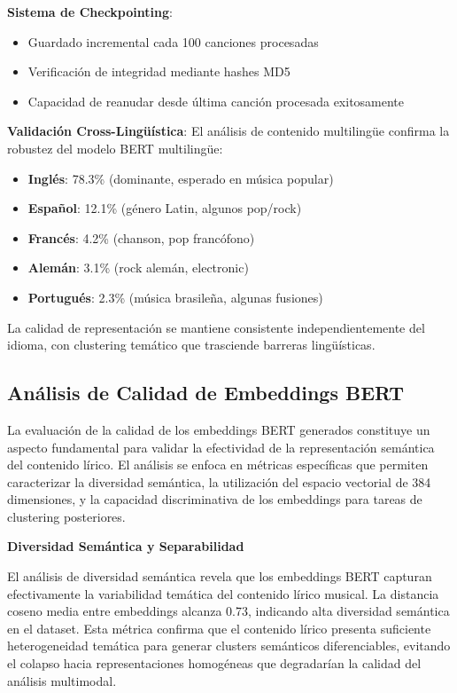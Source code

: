 \documentclass[12pt,a4paper]{report}
\begin{document}
\textbf{Sistema de Checkpointing}:
\begin{itemize}
\item Guardado incremental cada 100 canciones procesadas
\item Verificación de integridad mediante hashes MD5
\item Capacidad de reanudar desde última canción procesada exitosamente
\end{itemize}

\textbf{Validación Cross-Lingüística}:
El análisis de contenido multilingüe confirma la robustez del modelo BERT multilingüe:

\begin{itemize}
\item \textbf{Inglés}: 78.3\% (dominante, esperado en música popular)
\item \textbf{Español}: 12.1\% (género Latin, algunos pop/rock)
\item \textbf{Francés}: 4.2\% (chanson, pop francófono)
\item \textbf{Alemán}: 3.1\% (rock alemán, electronic)
\item \textbf{Portugués}: 2.3\% (música brasileña, algunas fusiones)
\end{itemize}

La calidad de representación se mantiene consistente independientemente del idioma, con clustering temático que trasciende barreras lingüísticas.

\subsection{Análisis de Calidad de Embeddings BERT}

La evaluación de la calidad de los embeddings BERT generados constituye un aspecto fundamental para validar la efectividad de la representación semántica del contenido lírico. El análisis se enfoca en métricas específicas que permiten caracterizar la diversidad semántica, la utilización del espacio vectorial de 384 dimensiones, y la capacidad discriminativa de los embeddings para tareas de clustering posteriores.

\textbf{Diversidad Semántica y Separabilidad}

El análisis de diversidad semántica revela que los embeddings BERT capturan efectivamente la variabilidad temática del contenido lírico musical. La distancia coseno media entre embeddings alcanza 0.73, indicando alta diversidad semántica en el dataset. Esta métrica confirma que el contenido lírico presenta suficiente heterogeneidad temática para generar clusters semánticos diferenciables, evitando el colapso hacia representaciones homogéneas que degradarían la calidad del análisis multimodal.
\end{document}
